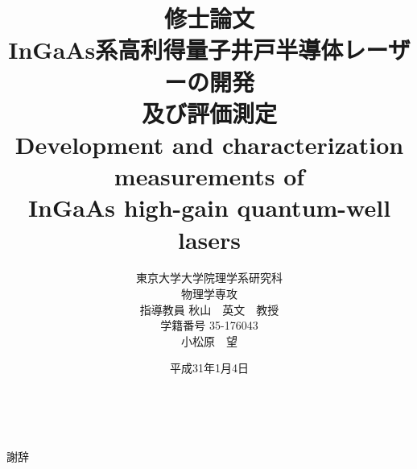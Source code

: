 \documentclass[11pt]{jreport}
\title{
{\LARGE 修士論文\\[1cm]}
{\huge InGaAs系高利得量子井戸半導体レーザーの開発\\及び評価測定\\[1cm]
Development and characterization measurements of \\InGaAs high-gain quantum-well
lasers\\[5cm]}
}
\date{\LARGE 平成31年1月4日}
\author{\LARGE 東京大学大学院理学系研究科\\
\LARGE 物理学専攻\\[1cm]
\LARGE 指導教員 秋山　英文　教授\\[1cm]
\LARGE 学籍番号 35-176043\\
\LARGE 小松原　望}
\begin{document}
\maketitle			%
\tableofcontents 	%
\listoffigures 		%
\listoftables　		%



謝辞\\
\begin{comment}
秋山英文教授には2年間の修士課程を通して物理への向き合い方だけではなく、人としての生き方を教えていただいたように思う。先生の下で過ごすことができたことを誇りに思う。


挟間優治助教授は居室での席が近かったことも合間って研究室生活を意義のあるものにしていただいたと感じている。初歩的な質問にも丁寧に答えてくださりありがとうございました。


秋山研究室メンバーの同期である柴田桂成氏は本質的な物理への探究心を持った人物であり、日々の会話の中で多大なる刺激をもらうことだでき有意義な毎日を送ることができた。


また先輩である中村考宏氏からはもっとも多くのことを学ばせていただいた。実験具体的な手法から半導体プロセスまでありとあらゆる場面で学ばせていただいた。


特任研究員の金昌秀氏には劈開、電極の蒸着やエッチングプロセスを一緒にやっていただいた。非常に丁寧な作業姿からは物事に取り組む姿勢を感じた。




中前秀一氏にはレーザー動作に関する基礎物理の議論をしていただいたことが記憶に新しい。
陶仁春氏はときを同じくして秋山研究室に所属したメンバーの一人であり、日常生活から利得スイッチング実験まで一緒に学ぶことが多かった。陶氏の研究への真摯な態度の日常生活での気の利いた冗談はとても心地の良いものであった。


薄倉淳子氏とは日常会話で気分を明るくしていただいた。
廣瀬修平氏は数少ない後輩であり、日々のたわいもない雑談がどれほど励みになったであろうか。


その他秋山研究室で共に過ごしたOB,OGのみなさまには感謝をしている。


伊藤隆氏


NTT-...の奥哲氏はレーザー開発の中枢をになっていただいた。あまりにも豊富は経験をそれゆえのプロセスにおけるポイントの押さえ方からは一緒に作業を行うだけでも学ぶところが非常に多かった。素人の質問にも懇切丁寧に説明をしていただき大変理解が深まったことは言うまでもない。
また試料提供をしていただいたNTT-ATの職員の方々、およびオプトウェル社の職員の方々にも感謝の意を示したい。
最後にときおり進路や学業の相談に乗ってくれた父と多忙の中実家で日々の生活を支えてくれた母に感謝の意を表して締めとしたい。

\end{comment}
\end{document}

